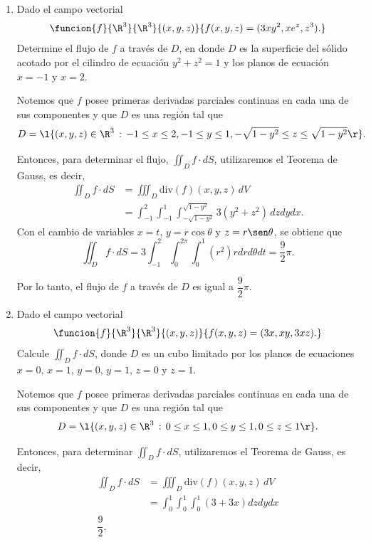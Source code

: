 \documentclass[a4,11pt]{aleph-examen}
\begin{document}
\begin{preguntas}
\begin{respuesta}
\begin{respuesta}
\begin{respuesta}
\begin{enumerate}
\item Dado el campo vectorial
    \[
    \funcion{f}{\R^3}{\R^3}
    {(x,y,z)}{f(x,y,z)=(3xy^2,xe^z,z^3).}
	\]
    Determine el flujo de $f$ a través de $D$, en donde $D$ es la superficie del sólido acotado por el cilindro de ecuación $y^2 + z^2 = 1$ y los planos de ecuación $x=-1$ y $x=2$.

\begin{respuesta}
    Notemos que $f$ posee primeras derivadas parciales continuas en cada una de sus componentes y que $D$ es una región tal que  
\[
D = \l\{(x,y,z)\in\R^3\,:\,-1\leq x \leq 2, -1 \leq y \leq 1, -\sqrt{1-y^2}\leq z \leq \sqrt{1-y^2}\r\}.
\]

\noindent Entonces, para determinar el flujo, $\iint_{D}{f\cdot dS}$, utilizaremos el Teorema de Gauss, es decir, 
    \begin{align*}
    \iint_{D}{f\cdot dS} &= \iiint_{D}{\mbox{div}(f)(x,y,z)\,dV}\\
    &= \int_{-1}^{2}{\int_{-1}^{1}{\int_{-\sqrt{1-y^2}}^{\sqrt{1-y^2}}{3(y^2 + z^2)\,dz}dy}dx}.
    \end{align*}
    Con el cambio de variables $x=t$, $y=r\cos\theta$ y $z=r\sen\theta$, se obtiene que 
    \[
    \iint_{D}{f\cdot dS} = 3\int_{-1}^{2}{\int_{0}^{2\pi}{\int_{0}^{1}{(r^2)rdr}d\theta}dt} = \dfrac{9}{2}\pi.
    \]
    
    \noindent Por lo tanto, el flujo de $f$ a través de $D$ es igual a $\dfrac{9}{2}\pi$.
\end{respuesta}

\item
    Dado el campo vectorial
    \[
    \funcion{f}{\R^3}{\R^3}
    {(x,y,z)}{f(x,y,z)=(3x,xy,3xz).}
	\]
    Calcule $\iint_{D}{f\cdot dS}$, donde $D$ es un cubo limitado por los planos de ecuaciones $x=0$, $x=1$, $y=0$, $y=1$, $z=0$ y $z=1$.

\begin{respuesta}
Notemos que $f$ posee primeras derivadas parciales continuas en cada una de sus componentes y que $D$ es una región tal que  
\[
D = \l\{(x,y,z)\in\R^3\,:\,0\leq x \leq 1, 0 \leq y \leq 1, 0 \leq z \leq 1\r\}.
\]

\noindent Entonces, para determinar $\iint_{D}{f\cdot dS}$, utilizaremos el Teorema de Gauss, es decir, 
    \begin{align*}
    \iint_{D}{f\cdot dS} &= \iiint_{D}{\mbox{div}(f)(x,y,z)\,dV}\\
    &= \int_{0}^{1}{\int_{0}^{1}{\int_{0}^{1}{(3+3x)dz}dy}dx}\\
    \dfrac{9}{2}.
    \end{align*}
    

\end{respuesta}
\end{enumerate}
\end{respuesta}
\end{respuesta}
\end{respuesta}
\end{preguntas}
\end{document}
